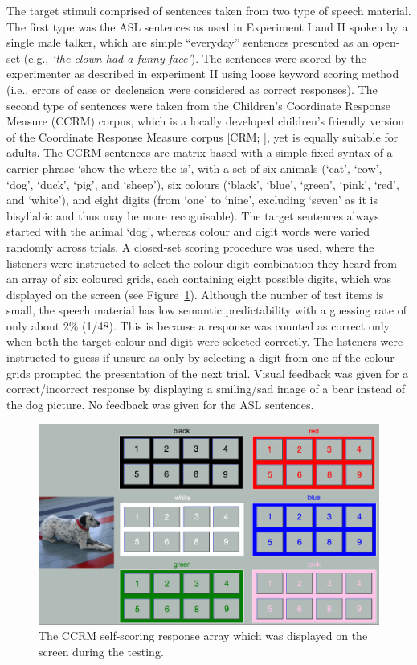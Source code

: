 \documentclass[a4paper, twoside]{templates/ociamthesis}
\begin{document}
\hfill\break
The target stimuli comprised of sentences taken from two type of speech material. The first type was the ASL sentences \autocite{MacLeod1990} as used in Experiment I and II spoken by a single male talker, which are simple ``everyday'' sentences presented as an open-set (e.g., \emph{`the clown had a funny face'}). The sentences were scored by the experimenter as described in experiment II using loose keyword scoring method (i.e., errors of case or declension were considered as correct responses). The second type of sentences were taken from the Children's Coordinate Response Measure (CCRM) corpus, which is a locally developed children's friendly version of the Coordinate Response Measure corpus {[}CRM; \textcite{Bolia2000}{]}, yet is equally suitable for adults. The CCRM sentences are matrix-based with a simple fixed syntax of a carrier phrase `show the where the is', with a set of six animals (`cat', `cow', `dog', `duck', `pig', and `sheep'), six colours (`black', `blue', `green', `pink', `red', and `white'), and eight digits (from `one' to `nine', excluding `seven' as it is bisyllabic and thus may be more recognisable). The target sentences always started with the animal `dog', whereas colour and digit words were varied randomly across trials. A closed-set scoring procedure was used, where the listeners were instructed to select the colour-digit combination they heard from an array of six coloured grids, each containing eight possible digits, which was displayed on the screen (see Figure~\ref{fig:CCRM-scoring}). Although the number of test items is small, the speech material has low semantic predictability with a guessing rate of only about 2\% (1/48). This is because a response was counted as correct only when both the target colour and digit were selected correctly. The listeners were instructed to guess if unsure as only by selecting a digit from one of the colour grids prompted the presentation of the next trial. Visual feedback was given for a correct/incorrect response by displaying a smiling/sad image of a bear instead of the dog picture. No feedback was given for the ASL sentences.\\

\begin{figure}[ht]
\center
\includegraphics[width=\textwidth]{figures/Chapt1/CCRM_Scoring.PNG}
\caption{\label{fig:CCRM-scoring}{The CCRM self-scoring response array which was displayed on the screen during the testing.}}
\end{figure}
\end{document}
